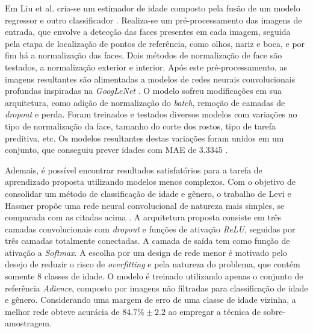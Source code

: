 Em  Liu et al. cria-se um estimador de idade composto pela fusão de um modelo regressor e outro classificador \cite{liu2015agenet}. Realiza-se um pré-processamento das imagens de entrada, que envolve a detecção das faces presentes em cada imagem, seguida pela etapa de localização de pontos de referência, como olhos, nariz e boca, e por fim há a normalização das faces. Dois métodos de normalização de face são testados, a normalização exterior e interior. Após este pré-processamento, as imagens resultantes são alimentadas a modelos de redes neurais convolucionais profundas inspiradas na \emph{GoogLeNet} \cite{inception}. O modelo sofreu modificações em sua arquitetura, como adição de normalização do \emph{batch}, remoção de camadas de \emph{dropout} e perda. Foram treinados e testados diversos modelos com variações no tipo de normalização da face, tamanho do corte dos rostos, tipo de tarefa preditiva, etc. Os modelos resultantes destas variações foram unidos em um conjunto, que conseguiu prever idades com MAE de $3.3345$ \cite{liu2015agenet}.

Ademais, é possível encontrar resultados satisfatórios para a tarefa de aprendizado proposta utilizando modelos menos complexos. Com o objetivo de consolidar um método de classificação de idade e gênero, o trabalho de Levi e Hassner  propõe uma rede neural convolucional de natureza mais simples, se comparada com as citadas acima \cite{levi2015age}. A arquitetura proposta consiste em três camadas convolucionais com \emph{dropout} e funções de ativação \emph{ReLU}, seguidas por três camadas totalmente conectadas. A camada de saída tem como função de ativação a  \emph{Softmax}. A escolha por um design de rede menor é motivado pelo desejo de reduzir o risco de \emph{overfitting} e pela natureza do problema, que contém somente 8 classes de idade. O modelo é treinado utilizando apenas o conjunto de referência \emph{Adience}, composto por imagens não filtradas para classificação de idade e gênero. Considerando uma margem de erro de uma classe de idade vizinha, a melhor rede obteve acurácia de $84.7\% \pm 2.2$ ao empregar a técnica de sobre-amostragem.
